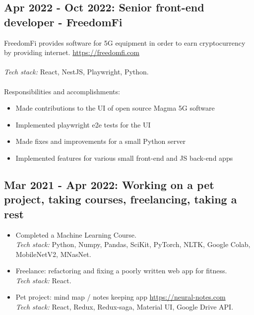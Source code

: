 \documentclass[a4paper, 14pt]{article}
\begin{document}
  \subsection{Apr 2022 - Oct 2022: Senior front-end developer - FreedomFi}

  FreedomFi provides software for 5G equipment in order to earn cryptocurrency by providing internet. \url{https://freedomfi.com} \\
  \\
  \textit{Tech stack:} React, NestJS, Playwright, Python. \\
  \\
  Responsibilities and accomplishments:
    \begin{itemize}
      \item Made contributions to the UI of open source Magma 5G software \\
      \item Implemented playwright e2e tests for the UI \\
      \item Made fixes and improvements for a small Python server \\
      \item Implemented features for various small front-end and JS back-end apps
    \end{itemize}

  \subsection{Mar 2021 - Apr 2022: Working on a pet project, taking courses, freelancing, taking a rest}

    \begin{itemize}
      \item Completed a Machine Learning Course. \\
      \textit{Tech stack:} Python, Numpy, Pandas, SciKit, PyTorch, NLTK, Google Colab, MobileNetV2, MNasNet. \\
      \item Freelance: refactoring and fixing a poorly written web app for fitness. \\
      \textit{Tech stack:} React. \\
      \item Pet project: mind map / notes keeping app \url{https://neural-notes.com} \\
      \textit{Tech stack:} React, Redux, Redux-saga, Material UI, Google Drive API.
    \end{itemize}
  \bigskip
\end{document}

